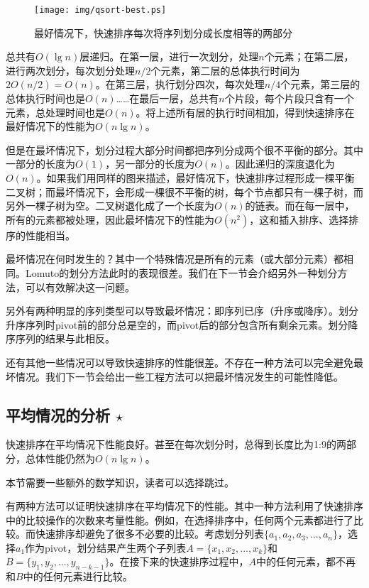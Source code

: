 \documentclass[UTF8]{article}
\begin{document}
\begin{figure}[htbp]
 \centering
 \texttt{[image: img/qsort-best.ps]}
 \caption{最好情况下，快速排序每次将序列划分成长度相等的两部分}
 \label{fig:qsort-best}
\end{figure}

总共有$O(\lg n)$层递归。在第一层，进行一次划分，处理$n$个元素；在第二层，进行两次划分，每次划分处理$n/2$个元素，第二层的总体执行时间为$2 O(n/2) = O(n)$。在第三层，执行划分四次，每次处理$n/4$个元素，第三层的总体执行时间也是$O(n)$……在最后一层，总共有$n$个片段，每个片段只含有一个元素，总处理时间也是$O(n)$。将上述所有层的执行时间相加，得到快速排序在最好情况下的性能为$O(n \lg n)$。

但是在最坏情况下，划分过程大部分时间都把序列分成两个很不平衡的部分。其中一部分的长度为$O(1)$，另一部分的长度为$O(n)$。因此递归的深度退化为$O(n)$。如果我们用同样的图来描述，最好情况下，快速排序过程形成一棵平衡二叉树；而最坏情况下，会形成一棵很不平衡的树，每个节点都只有一棵子树，而另外一棵子树为空。二叉树退化成了一个长度为$O(n)$的链表。而在每一层中，所有的元素都被处理，因此最坏情况下的性能为$O(n^2)$，这和插入排序、选择排序的性能相当。

最坏情况在何时发生的？其中一个特殊情况是所有的元素（或大部分元素）都相同。Lomuto的划分方法此时的表现很差。我们在下一节会介绍另外一种划分方法，可以有效解决这一问题。

另外有两种明显的序列类型可以导致最坏情况：即序列已序（升序或降序）。划分升序序列时pivot前的部分总是空的，而pivot后的部分包含所有剩余元素。划分降序序列的结果与此相反。

还有其他一些情况可以导致快速排序的性能很差。不存在一种方法可以完全避免最坏情况。我们下一节会给出一些工程方法可以把最坏情况发生的可能性降低。

\subsection{平均情况的分析 $\star$}

快速排序在平均情况下性能良好。甚至在每次划分时，总得到长度比为1:9的两部分，总体性能仍然为$O(n \lg n)$\cite{CLRS}。

本节需要一些额外的数学知识，读者可以选择跳过。

有两种方法可以证明快速排序在平均情况下的性能。其中一种方法利用了快速排序中的比较操作的次数来考量性能\cite{CLRS}。例如，在选择排序中，任何两个元素都进行了比较。而快速排序却避免了很多不必要的比较。考虑划分列表$\{ a_1, a_2, a_3, ..., a_n\}$，选择$a_1$作为pivot，划分结果产生两个子列表$A = \{x_1, x_2, ..., x_k\}$和$B = \{ y_1, y_2, ..., y_{n-k-1} \}$。在接下来的快速排序过程中，$A$中的任何元素，都不再和$B$中的任何元素进行比较。
\end{document}
